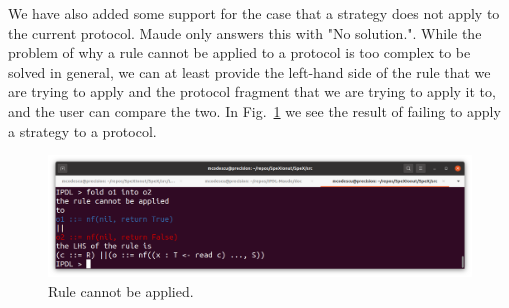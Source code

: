 \documentclass{article}
\begin{document}
We have also added some support for the case that a strategy does not
apply to the current protocol. Maude only answers this with "No solution.".
While the problem of why a rule cannot be applied to a protocol is too
complex to be solved in general, we can at least provide the left-hand side of the rule that we are trying to apply and the protocol fragment that we
are trying to apply it to, and the user can compare the two. In Fig.~\ref{fig:rule} we see the result of failing to apply a strategy to
a protocol.

\begin{figure}[htp]
\caption{Rule cannot be applied.}\label{fig:rule}
\centering
\includegraphics[width=\textwidth]{proof}
\end{figure}
\end{document}
